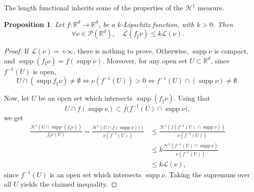 \documentclass[10pt]{amsart}
\newtheorem{proposition}[theorem]{Proposition}
\theoremstyle{definition}
\newcommand\cH{\mathcal{H}}
\newcommand\cL{\mathcal{L}}
\newcommand{\RR}{\mathbb{R}}
\DeclareMathOperator{\supp}{supp}
\begin{document}
The length functional inherits some of the properties of the $\cH^1$ measure.
\begin{proposition}\label{prop.length.lipschitz}
Let $f\colon \RR^d\rightarrow \RR^d$, be a $k$-Lipschitz function, with $k>0$. Then
\begin{equation}
\forall \nu \in \mathcal{P}(\RR^d),\quad \cL(f_\sharp\nu)\leq k \cL(\nu). \label{eq.lipschitzlength}
\end{equation}
\end{proposition}

\begin{proof}
If $\cL(\nu)=+\infty$, there is nothing to prove. Otherwise, $\supp \nu$ is compact, and $\supp(f_\sharp \nu)= f(\supp \nu)$.
Moreover, for any open set $U \subset \RR^d$, since $f^{-1}(U)$ is open,
\begin{equation*}
U\cap \left(\supp f_\sharp \nu\right)\neq \emptyset \iff \nu(f^{-1}(U))>0 \iff f^{-1}(U)\cap \left(\supp \nu\right)\neq \emptyset.
\end{equation*}

Now, let $U$ be an open set which intersects $\supp(f_\sharp \nu)$. Using that
\begin{equation*}
U\cap f(\supp \nu) \subset f\bigl(f^{-1}(U)\cap \supp \nu\bigr),
\end{equation*}
we get
\begin{align*}
\frac{\cH^1\left(U\cap \supp (f_\sharp \nu)\right)}{f_\sharp\nu(U)}= \frac{\cH^1\left(U\cap f(\supp \nu))\right)}{\nu(f^{-1}(U))}
&\leq \frac{\cH^1\left(f\left(f^{-1}(U)\cap \supp \nu\right)\right)}{\nu(f^{-1}(U))}\\
&\leq k\frac{\cH^1\left(f^{-1}(U)\cap \supp \nu\right)}{\nu(f^{-1}(U))}\\
&\leq k\mathcal{L}(\nu),
\end{align*}
since $f^{-1}(U)$ is an open set which intersects $\supp \nu$.
Taking the supremum over all $U$ yields the claimed inequality.
\end{proof}
\end{document}
